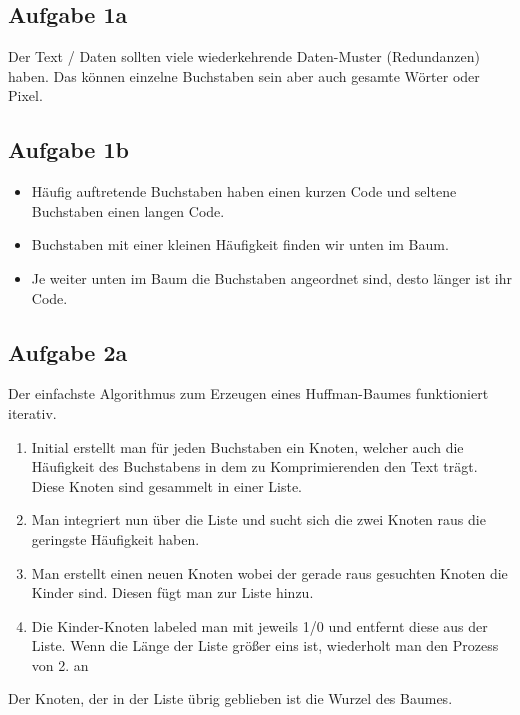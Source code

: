 \documentclass{article}
\begin{document}
\subsection*{Aufgabe 1a}

Der Text / Daten sollten viele wiederkehrende Daten-Muster (Redundanzen) haben. Das können einzelne Buchstaben sein aber auch gesamte Wörter oder Pixel.

\subsection*{Aufgabe 1b}

\begin{itemize}
\item Häufig auftretende Buchstaben haben einen kurzen Code und seltene Buchstaben einen langen Code.
\item Buchstaben mit einer kleinen Häufigkeit finden wir unten im Baum.
\item Je weiter unten im Baum die Buchstaben angeordnet sind, desto länger ist ihr Code.
\end{itemize}


\subsection*{Aufgabe 2a}

Der einfachste Algorithmus zum Erzeugen eines Huffman-Baumes funktioniert iterativ.

\begin{enumerate}

\item  Initial erstellt man für jeden Buchstaben ein Knoten, welcher auch die Häufigkeit des Buchstabens in dem zu Komprimierenden den Text trägt. Diese Knoten sind gesammelt in einer Liste.

\item Man integriert nun über die Liste und sucht sich die zwei Knoten raus die geringste Häufigkeit haben.

\item Man erstellt einen neuen Knoten wobei der gerade raus gesuchten Knoten die Kinder sind. Diesen fügt man zur Liste hinzu.

\item Die Kinder-Knoten labeled man mit jeweils 1/0 und entfernt diese aus der Liste. Wenn die Länge der Liste größer eins ist, wiederholt man den Prozess von 2. an

\end{enumerate}
Der Knoten, der in der Liste übrig geblieben ist die Wurzel des Baumes.
\end{document}
